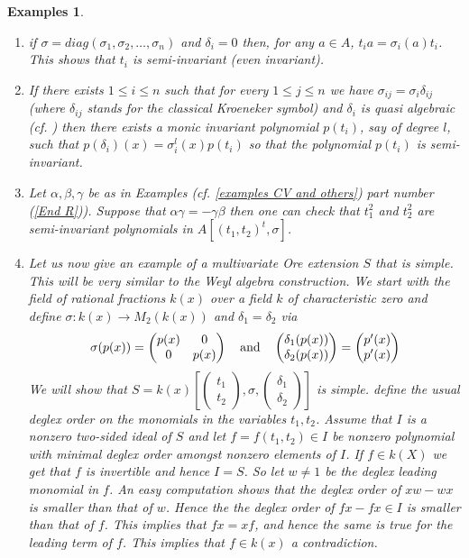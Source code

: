 \documentclass[12pt,a4paper]{article}
\newtheorem{examples}[theorem]{Examples}
\begin{document}
	\begin{examples} \label{examples for Semi invariant and others}
	{\rm 
		\begin{enumerate}
			\item if $\sigma=diag(\sigma_1,\sigma_2,\dots, \sigma_n)$ and $\delta_i=0$ then, for any $a\in A$, $t_ia=\sigma_i(a)t_i$.  This shows that $t_i$ is semi-invariant (even invariant).
			\item If there exists $1\le i \le n$ such that for every $1\le j \le n$ we have $\sigma_{ij}=\sigma_{i}\delta_{ij}$ (where $\delta_{ij}$ stands for the classical Kroeneker symbol) and $\delta_i$ is quasi algebraic (cf. \cite{LM})  then there exists a monic invariant polynomial $p(t_i)$, say of degree $l$, such that $p(\delta_i)(x)=\sigma_i^l(x)p(t_i)$ so that the polynomial $p(t_i)$ is semi-invariant.  
			\item Let $\alpha,\beta,\gamma$ be as in Examples (cf. \ref{examples CV and others}) part number (\ref{End R})). Suppose that $\alpha\gamma=-\gamma\beta$ then one can check that $t_1^2$ and $t_2^2$ are semi-invariant polynomials in $A[(t_1,t_2)^t,\sigma]$.
	
	\item Let us now give an example of a multivariate Ore extension $S$ that is simple.   This will be very similar to the Weyl algebra construction.
	We start with the field of rational fractions $k(x)$ over a field $k$ of characteristic zero and define $\sigma :k(x) \rightarrow M_2(k(x))$ and $\delta_1=\delta_2 $ via
	$$
	\sigma(p(x))=\begin{pmatrix}
		p(x) & 0 \\
		0 & p(x)
	\end{pmatrix} \quad {\rm and} \quad \begin{pmatrix}
		\delta_1(p(x)) \\
		\delta_2(p(x))
	\end{pmatrix} =\begin{pmatrix}
		p'(x) \\
		p'(x)
	\end{pmatrix}
	$$
	We will show that $S=k(x)[\begin{pmatrix}
		t_1 \\
		t_2
	\end{pmatrix},\sigma,\begin{pmatrix} 
		\delta_1 \\
		\delta_2
	\end{pmatrix}]$ is simple.
	define the usual deglex order on the monomials in the variables $t_1,t_2$.   Assume that $I$ is a nonzero two-sided ideal of $S$ and let $f=f(t_1,t_2)\in I$ be nonzero polynomial with minimal deglex order amongst nonzero elements of $I$.   If $f\in k(X)$ we get that $f$ is invertible and hence $I=S$.  So let $w\ne 1$ be the deglex leading monomial in $f$.  An easy computation shows that the deglex order of $xw-wx$ is smaller than that of $w$.  Hence the the deglex order  of $fx-fx\in I$ is smaller than that of $f$.  This implies that $fx=xf$, and hence the same is true for the leading term of $f$.  This implies that $f\in k(x)$ a contradiction.



\end{enumerate}}
\end{examples}
\end{document}
